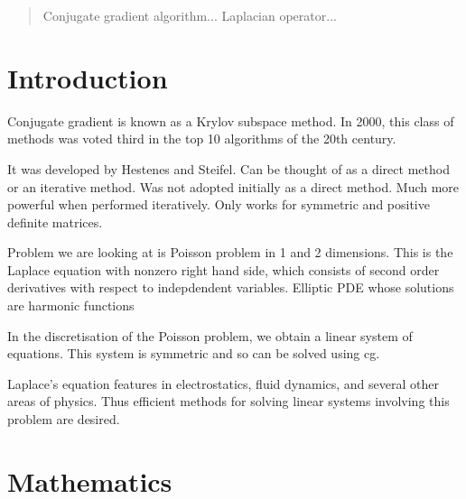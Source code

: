 \begin{abstract}
    Conjugate gradient algorithm... Laplacian operator... 
\end{abstract}

\section{Introduction}

\iffalse
Interesting, cogent account of the work in this report
> in the context of the mathematical problem considered 
> in the scientific computing more widely
Very well referenced.

Talk about the problems we are going to discuss
> Laplacian operator. Finite difference of the finite difference of Laplace
> How do we get the matrix?
> Both for 1 and 2D.

Top 10 algorithms 20th century. How does it relate to wider mathematical community?

\fi

Conjugate gradient is known as a Krylov subspace method. 
In 2000, this class of methods was voted third in the top 10 algorithms of the 20th century.

It was developed by Hestenes and Steifel.
Can be thought of as a direct method or an iterative method.
Was not adopted initially as a direct method.
Much more powerful when performed iteratively.
Only works for symmetric and positive definite matrices.

Problem we are looking at is Poisson problem in 1 and 2 dimensions.
This is the Laplace equation with nonzero right hand side, which consists of second order derivatives with respect to indepdendent variables.
Elliptic PDE whose solutions are harmonic functions

In the discretisation of the Poisson problem, we obtain a linear system of equations.
This system is symmetric and so can be solved using cg.

Laplace's equation features in electrostatics, fluid dynamics, and several other areas of physics.
Thus efficient methods for solving linear systems involving this problem are desired.




\section{Mathematics}

\iffalse
CG discussion:

Main algorithm
Mathematics of the mechanism
Preconditioning
Limitations of the algorithm
How do we get good/bad convergence?
Proof of convergence
Proof of complexity
\fi

